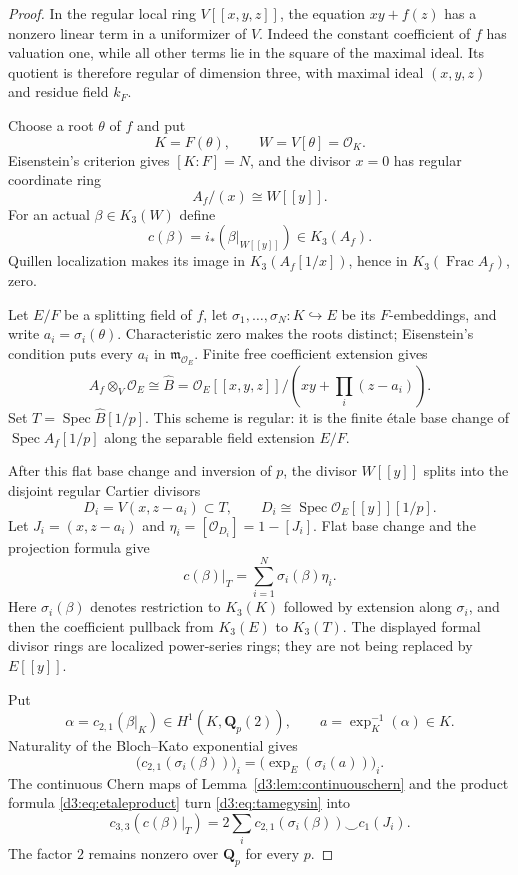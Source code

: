 \documentclass[11pt,a4paper]{amsart}
\numberwithin{equation}{section}
\theoremstyle{definition}
\theoremstyle{remark}
\newcommand{\Q}{\mathbf Q}
\newcommand{\OO}{\mathcal O}
\newcommand{\Spec}{\operatorname{Spec}}
\newcommand{\Frac}{\operatorname{Frac}}
\begin{document}
\begin{proof}
In the regular local ring $V[[x,y,z]]$, the equation $xy+f(z)$ has a nonzero linear term in a uniformizer of $V$. Indeed the constant coefficient of $f$ has valuation one, while all other terms lie in the square of the maximal ideal. Its quotient is therefore regular of dimension three, with maximal ideal $(x,y,z)$ and residue field $k_F$.

Choose a root $\theta$ of $f$ and put
\[
K=F(\theta),\qquad W=V[\theta]=\OO_K.
\]
Eisenstein's criterion gives $[K:F]=N$, and the divisor $x=0$ has regular coordinate ring
\[
A_f/(x)\cong W[[y]].
\]
For an actual $\beta\in K_3(W)$ define
\[
c(\beta)=i_*(\beta|_{W[[y]]})\in K_3(A_f).
\]
Quillen localization \cite{Quillen} makes its image in $K_3(A_f[1/x])$, hence in $K_3(\Frac A_f)$, zero.

Let $E/F$ be a splitting field of $f$, let $\sigma_1,\ldots,\sigma_N:K\hookrightarrow E$ be its $F$-embeddings, and write $a_i=\sigma_i(\theta)$. Characteristic zero makes the roots distinct; Eisenstein's condition puts every $a_i$ in $\mathfrak m_{\OO_E}$. Finite free coefficient extension gives
\[
A_f\otimes_V\OO_E
\cong
\widehat B=\OO_E[[x,y,z]]/
\left(xy+\prod_i(z-a_i)\right).
\]
Set $T=\Spec\widehat B[1/p]$. This scheme is regular: it is the finite \'etale base change of $\Spec A_f[1/p]$ along the separable field extension $E/F$.

After this flat base change and inversion of $p$, the divisor $W[[y]]$ splits into the disjoint regular Cartier divisors
\[
D_i=V(x,z-a_i)\subset T,\qquad
D_i\cong\Spec\OO_E[[y]][1/p].
\]
Let $J_i=(x,z-a_i)$ and $\eta_i=[\OO_{D_i}]=1-[J_i]$. Flat base change and the projection formula give
\begin{equation}\label{d3:eq:tamegysin}
c(\beta)|_T=\sum_{i=1}^N\sigma_i(\beta)\eta_i.
\end{equation}
Here $\sigma_i(\beta)$ denotes restriction to $K_3(K)$ followed by extension along $\sigma_i$, and then the coefficient pullback from $K_3(E)$ to $K_3(T)$. The displayed formal divisor rings are localized power-series rings; they are not being replaced by $E[[y]]$.

Put
\[
\alpha=c_{2,1}(\beta|_K)\in H^1(K,\Q_p(2)),
\qquad a=\exp_K^{-1}(\alpha)\in K.
\]
Naturality of the Bloch--Kato exponential gives
\begin{equation}\label{d3:eq:tamecoefficientvector}
\bigl(c_{2,1}(\sigma_i(\beta))\bigr)_i
=\bigl(\exp_E(\sigma_i(a))\bigr)_i.
\end{equation}
The continuous Chern maps of Lemma~\ref{d3:lem:continuouschern} and the product formula \eqref{d3:eq:etaleproduct} turn \eqref{d3:eq:tamegysin} into
\[
c_{3,3}(c(\beta)|_T)
=2\sum_i c_{2,1}(\sigma_i(\beta))\smile c_1(J_i).
\]
The factor $2$ remains nonzero over $\Q_p$ for every $p$.


\end{proof}
\end{document}
